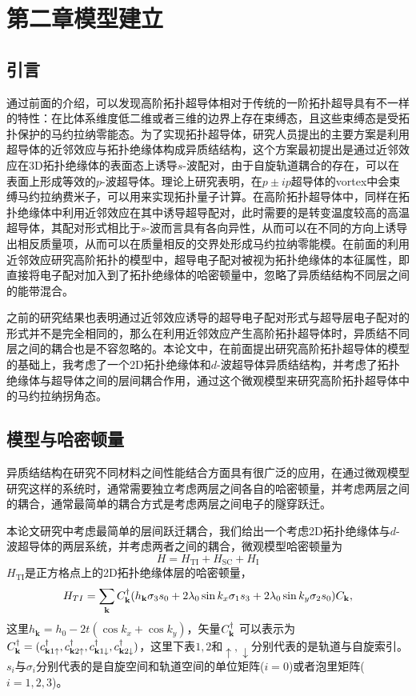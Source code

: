 \section{第二章\quad 模型建立}
\subsection{引言}
 通过前面的介绍，可以发现高阶拓扑超导体相对于传统的一阶拓扑超导具有不一样的特性：在比体系维度低二维或者三维的边界上存在束缚态，且这些束缚态是受拓扑保护的马约拉纳零能态。为了实现拓扑超导体，研究人员提出的主要方案是利用超导体的近邻效应与拓扑绝缘体构成异质结结构，这个方案最初提出是通过近邻效应在3D拓扑绝缘体的表面态上诱导$s$-波配对，由于自旋轨道耦合的存在，可以在表面上形成等效的$p$-波超导体。理论上研究表明，在$p\pm ip$超导体的vortex中会束缚马约拉纳费米子，可以用来实现拓扑量子计算。在高阶拓扑超导体中，同样在拓扑绝缘体中利用近邻效应在其中诱导超导配对，此时需要的是转变温度较高的高温超导体，其配对形式相比于$s$-波而言具有各向异性，从而可以在不同的方向上诱导出相反质量项，从而可以在质量相反的交界处形成马约拉纳零能模。在前面的利用近邻效应研究高阶拓扑的模型中，超导电子配对被视为拓扑绝缘体的本征属性，即直接将电子配对加入到了拓扑绝缘体的哈密顿量中，忽略了异质结结构不同层之间的能带混合。

 之前的研究结果也表明通过近邻效应诱导的超导电子配对形式与超导层电子配对的形式并不是完全相同的\cite{re48,re49}，那么在利用近邻效应产生高阶拓扑超导体时，异质结不同层之间的耦合也是不容忽略的。本论文中，在前面提出研究高阶拓扑超导体的模型\cite{re27,re28,re29}的基础上，我考虑了一个2D拓扑绝缘体和$d$-波超导体异质结结构，并考虑了拓扑绝缘体与超导体之间的层间耦合作用，通过这个微观模型来研究高阶拓扑超导体中的马约拉纳拐角态。
\subsection{模型与哈密顿量}
 异质结结构在研究不同材料之间性能结合方面具有很广泛的应用，在通过微观模型研究这样的系统时，通常需要独立考虑两层之间各自的哈密顿量，并考虑两层之间的耦合，通常最简单的耦合方式是考虑两层之间电子的隧穿跃迁。

 本论文研究中考虑最简单的层间跃迁耦合，我们给出一个考虑2D拓扑绝缘体与$d$-波超导体的两层系统，并考虑两者之间的耦合，微观模型哈密顿量为
\begin{equation}
H=H_\mathrm{TI}+H_\mathrm{SC}+H_\mathrm{I}\label{ham}
\end{equation}
$H_\mathrm{TI}$是正方格点上的2D拓扑绝缘体层的哈密顿量\cite{re56,re57}，
\begin{equation}
\begin{aligned}
H_{TI} =\sum_{{\bf k}}C_{{\bf k}}^\dagger (h_\mathbf{k}\sigma_3s_0+2\lambda_{0}\sin k_x\sigma_1s_3+2\lambda_0\sin k_y\sigma_2 s_0)C_{{\bf k}},
\end{aligned}
\end{equation}
这里$h_\mathbf{k}=h_0-2t(\cos k_x+\cos k_y)$，矢量$C^\dagger_{\bf k}$ 可以表示为$C^\dagger_{\bf k}=(c^\dagger_{{\bf k}1\uparrow},c^\dagger_{{\bf k}2\uparrow},c^\dagger_{{\bf k}1\downarrow},c^\dagger_{{\bf k}2\downarrow})$，这里下表$1,2$和$\uparrow,\downarrow$分别代表的是轨道与自旋索引。$s_i$与$\sigma_i$分别代表的是自旋空间和轨道空间的单位矩阵($i=0$)或者泡里矩阵($i=1,2,3$)。

